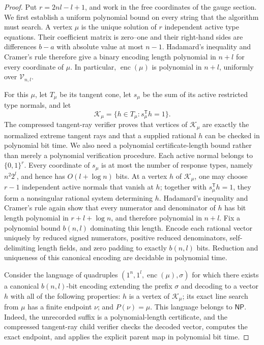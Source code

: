 \documentclass{article}
\begin{document}
\begin{proof}
Put \(r=2nl-l+1\), and work in the free coordinates of the gauge section. We first establish a uniform polynomial bound on every string that the algorithm must search. A vertex \(\mu\) is the unique solution of \(r\) independent active type equations. Their coefficient matrix is zero--one and their right-hand sides are differences \(b-a\) with absolute value at most \(n-1\). Hadamard's inequality and Cramer's rule therefore give a binary encoding length polynomial in \(n+l\) for every coordinate of \(\mu\). In particular, \(\operatorname{enc}(\mu)\) is polynomial in \(n+l\), uniformly over \(\mathcal V_{n,l}\).

For this \(\mu\), let \(T_\mu\) be its tangent cone, let \(s_\mu\) be the sum of its active restricted type normals, and let
\[
\mathcal K_\mu=\{h\in T_\mu:s_\mu^{\mathsf T}h=1\}.
\]
The compressed tangent-ray verifier proves that vertices of \(\mathcal K_\mu\) are exactly the normalized extreme tangent rays and that a supplied rational \(h\) can be checked in polynomial bit time. We also need a polynomial certificate-length bound rather than merely a polynomial verification procedure. Each active normal belongs to \(\{0,1\}^r\). Every coordinate of \(s_\mu\) is at most the number of response types, namely \(n^2 2^l\), and hence has \(O(l+\log n)\) bits. At a vertex \(h\) of \(\mathcal K_\mu\), one may choose \(r-1\) independent active normals that vanish at \(h\); together with \(s_\mu^{\mathsf T}h=1\), they form a nonsingular rational system determining \(h\). Hadamard's inequality and Cramer's rule again show that every numerator and denominator of \(h\) has bit length polynomial in \(r+l+\log n\), and therefore polynomial in \(n+l\). Fix a polynomial bound \(b(n,l)\) dominating this length. Encode each rational vector uniquely by reduced signed numerators, positive reduced denominators, self-delimiting length fields, and zero padding to exactly \(b(n,l)\) bits. Reduction and uniqueness of this canonical encoding are decidable in polynomial time.

Consider the language of quadruples \( (1^n,1^l,\operatorname{enc}(\mu),\sigma)\) for which there exists a canonical \(b(n,l)\)-bit encoding extending the prefix \(\sigma\) and decoding to a vector \(h\) with all of the following properties: \(h\) is a vertex of \(\mathcal K_\mu\); its exact line search from \(\mu\) has a finite endpoint \(\nu\); and \(P(\nu)=\mu\). This language belongs to \(\mathsf{NP}\). Indeed, the unrecorded suffix is a polynomial-length certificate, and the compressed tangent-ray child verifier checks the decoded vector, computes the exact endpoint, and applies the explicit parent map in polynomial bit time.


\end{proof}
\end{document}
